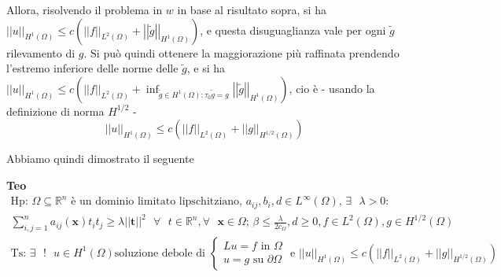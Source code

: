 \documentclass{article}
\begin{document}
Allora, risolvendo il problema in $w$ in base al risultato sopra, si ha $%
\left\vert \left\vert u\right\vert \right\vert _{H^{1}\left( \Omega \right)
}\leq c\left( \left\vert \left\vert f\right\vert \right\vert _{L^{2}\left(
\Omega \right) }+\left\vert \left\vert \tilde{g}\right\vert \right\vert
_{H^{1}\left( \Omega \right) }\right) $, e questa disuguaglianza vale per
ogni $\tilde{g}$ rilevamento di $g$. Si pu\`{o} quindi ottenere la
maggiorazione pi\`{u} raffinata prendendo l'estremo inferiore delle norme
delle $\tilde{g}$, e si ha $\left\vert \left\vert u\right\vert \right\vert
_{H^{1}\left( \Omega \right) }\leq c\left( \left\vert \left\vert
f\right\vert \right\vert _{L^{2}\left( \Omega \right) }+\inf_{\tilde{g}\in
H^{1}\left( \Omega \right) :\tau _{0}\tilde{g}=g}\left\vert \left\vert 
\tilde{g}\right\vert \right\vert _{H^{1}\left( \Omega \right) }\right) $, cio%
\`{e} - usando la definizione di norma $H^{1/2}$ -%
\begin{equation*}
\left\vert \left\vert u\right\vert \right\vert _{H^{1}\left( \Omega \right)
}\leq c\left( \left\vert \left\vert f\right\vert \right\vert _{L^{2}\left(
\Omega \right) }+\left\vert \left\vert g\right\vert \right\vert
_{H^{1/2}\left( \Omega \right) }\right)
\end{equation*}

Abbiamo quindi dimostrato il seguente

\textbf{Teo}%
\begin{gather*}
\text{Hp: }\Omega \subseteq 
\mathbb{R}
^{n}\text{ \`{e} un dominio limitato lipschitziano, }a_{ij},b_{i},d\in
L^{\infty }\left( \Omega \right) \text{, }\exists \text{ }\lambda >0: \\
\sum_{i,j=1}^{n}a_{ij}\left( \mathbf{x}\right) t_{i}t_{j}\geq \lambda
\left\vert \left\vert \mathbf{t}\right\vert \right\vert ^{2}\text{ }\forall 
\text{ }t\in 
\mathbb{R}
^{n},\forall \text{ }\mathbf{x}\in \Omega \text{; }\beta \leq \frac{\lambda 
}{2c_{\Omega }},d\geq 0,f\in L^{2}\left( \Omega \right) ,g\in H^{1/2}\left(
\Omega \right) \\
\text{Ts: }\exists \text{ }!\text{ }u\in H^{1}\left( \Omega \right) \text{
soluzione debole di }\left\{ 
\begin{array}{c}
Lu=f\text{ in }\Omega \\ 
u=g\text{ su }\partial \Omega%
\end{array}%
\right. \text{ e }\left\vert \left\vert u\right\vert \right\vert
_{H^{1}\left( \Omega \right) }\leq c\left( \left\vert \left\vert
f\right\vert \right\vert _{L^{2}\left( \Omega \right) }+\left\vert
\left\vert g\right\vert \right\vert _{H^{1/2}\left( \Omega \right) }\right)
\end{gather*}
\end{document}
